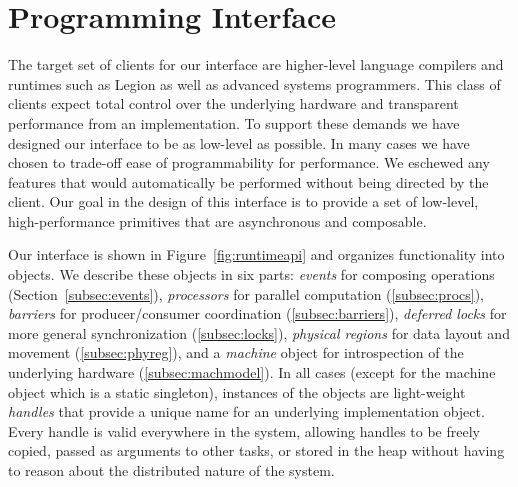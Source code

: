 
\section{Programming Interface}
\label{sec:interface}
The target set of clients for our interface are higher-level language
compilers and runtimes such as Legion\cite{Legion12} as well as 
advanced systems programmers.  This class of clients expect total control
over the underlying hardware and transparent performance from an
implementation.  To support these demands we have designed our interface
to be as low-level as possible.  In many cases we have chosen to trade-off
ease of programmability for performance.  We eschewed any features that would
automatically be performed without being directed by the client.
Our goal in the design of this interface is to provide a set of low-level,
high-performance primitives that are asynchronous and composable.

Our interface is shown in Figure~\ref{fig:runtimeapi} and organizes functionality into objects.  We describe
these objects in six parts: {\em events} for composing operations 
(Section~\ref{subsec:events}), {\em processors} for parallel computation 
(\ref{subsec:procs}), {\em barriers} for producer/consumer coordination (\ref{subsec:barriers}),
{\em deferred locks} for more general synchronization
(\ref{subsec:locks}), {\em physical regions} for data layout and movement
(\ref{subsec:phyreg}), and a {\em machine} object for introspection of the underlying
hardware (\ref{subsec:machmodel}).  In all cases (except for the
machine object which is a static singleton), instances of the objects
are light-weight {\em handles} that provide a unique name for an underlying
implementation object.
Every handle is valid everywhere in the system, allowing handles to be freely copied,
passed as arguments to other tasks, or stored in the heap
without having to reason about the distributed nature of the system.


